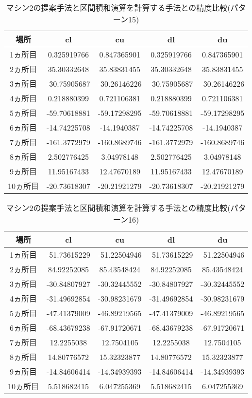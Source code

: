 \documentclass[11pt,a4paper]{jsreport}
\theoremstyle{definition}
\begin{document}
\begin{table}[H]
\centering
\begin{tabular}{|c|c|c|c|c|}
\hline
場所 & cl & cu & dl & du \\ \hline
1ヵ所目 & 0.325919766 & 0.847365901 & 0.325919766 & 0.847365901 \\ \hline
2ヵ所目 & 35.30332648 & 35.83831455 & 35.30332648 & 35.83831455 \\ \hline
3ヵ所目 & -30.75905687 & -30.26146226 & -30.75905687 & -30.26146226 \\ \hline
4ヵ所目 & 0.218880399 & 0.721106381 & 0.218880399 & 0.721106381 \\ \hline
5ヵ所目 & -59.70618881 & -59.17298295 & -59.70618881 & -59.17298295 \\ \hline
6ヵ所目 & -14.74225708 & -14.1940387 & -14.74225708 & -14.1940387 \\ \hline
7ヵ所目 & -161.3772979 & -160.8689746 & -161.3772979 & -160.8689746 \\ \hline
8ヵ所目 & 2.502776425 & 3.04978148 & 2.502776425 & 3.04978148 \\ \hline
9ヵ所目 & 11.95167433 & 12.47670189 & 11.95167433 & 12.47670189 \\ \hline
10ヵ所目 & -20.73618307 & -20.21921279 & -20.73618307 & -20.21921279 \\ \hline
\end{tabular}
\caption{マシン2の提案手法と区間積和演算を計算する手法との精度比較(パターン15)}
\end{table}

\begin{table}[H]
\centering
\begin{tabular}{|c|c|c|c|c|}
\hline
場所 & cl & cu & dl & du \\ \hline
1ヵ所目 & -51.73615229 & -51.22504946 & -51.73615229 & -51.22504946 \\ \hline
2ヵ所目 & 84.92252085 & 85.43548424 & 84.92252085 & 85.43548424 \\ \hline
3ヵ所目 & -30.84807927 & -30.32445552 & -30.84807927 & -30.32445552 \\ \hline
4ヵ所目 & -31.49692854 & -30.98231679 & -31.49692854 & -30.98231679 \\ \hline
5ヵ所目 & -47.41379009 & -46.89219565 & -47.41379009 & -46.89219565 \\ \hline
6ヵ所目 & -68.43679238 & -67.91720671 & -68.43679238 & -67.91720671 \\ \hline
7ヵ所目 & 12.2255038 & 12.7504105 & 12.2255038 & 12.7504105 \\ \hline
8ヵ所目 & 14.80776572 & 15.32323877 & 14.80776572 & 15.32323877 \\ \hline
9ヵ所目 & -14.84606414 & -14.34939393 & -14.84606414 & -14.34939393 \\ \hline
10ヵ所目 & 5.518682415 & 6.047255369 & 5.518682415 & 6.047255369 \\ \hline
\end{tabular}
\caption{マシン2の提案手法と区間積和演算を計算する手法との精度比較(パターン16)}
\end{table}
\end{document}
